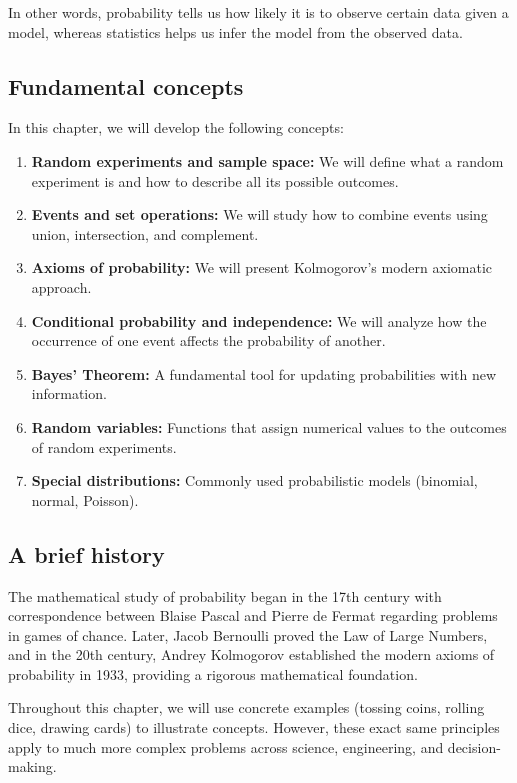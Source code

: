 In other words, probability tells us how likely it is to observe certain data given a model, whereas statistics helps us infer the model from the observed data.

\subsection*{Fundamental concepts}

In this chapter, we will develop the following concepts:

\begin{enumerate}
	\item \textbf{Random experiments and sample space:} We will define what a random experiment is and how to describe all its possible outcomes.
	\item \textbf{Events and set operations:} We will study how to combine events using union, intersection, and complement.
	\item \textbf{Axioms of probability:} We will present Kolmogorov's modern axiomatic approach.
	\item \textbf{Conditional probability and independence:} We will analyze how the occurrence of one event affects the probability of another.
	\item \textbf{Bayes' Theorem:} A fundamental tool for updating probabilities with new information.
	\item \textbf{Random variables:} Functions that assign numerical values to the outcomes of random experiments.
	\item \textbf{Special distributions:} Commonly used probabilistic models (binomial, normal, Poisson).
\end{enumerate}

\subsection*{A brief history}

The mathematical study of probability began in the 17th century with correspondence between Blaise Pascal and Pierre de Fermat regarding problems in games of chance. Later, Jacob Bernoulli proved the Law of Large Numbers, and in the 20th century, Andrey Kolmogorov established the modern axioms of probability in 1933, providing a rigorous mathematical foundation.

\begin{remark}
	Throughout this chapter, we will use concrete examples (tossing coins, rolling dice, drawing cards) to illustrate concepts. However, these exact same principles apply to much more complex problems across science, engineering, and decision-making.
\end{remark}
